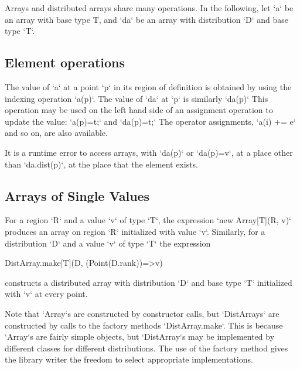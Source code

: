Arrays and distributed arrays share many operations.
In the following, let \xcd`a` be an array with base type T, and \xcd`da` be an
array with distribution \xcd`D` and base type \xcd`T`.




\subsection{Element operations}
The value of \xcd`a` at a point \xcd`p` in its region of definition is
obtained by using the indexing operation \xcd`a(p)`. 
The value of \xcd`da` at \xcd`p` is similarly
\xcd`da(p)`
This operation
may be used on the left hand side of an assignment operation to update
the value: 
\xcd`a(p)=t;`
and 
\xcd`da(p)=t;`
The operator assignments, \xcd`a(i) += e` and so on,  are also
available. 

It is a runtime error to 
access arrays, with \xcd`da(p)` or \xcd`da(p)=v`, at a place
other than \xcd`da.dist(p)`, \viz{} at the place that the element exists. 


\subsection{Arrays of Single Values}\label{ConstantArray}

For a region \xcd`R` and a value \xcd`v` of type \xcd`T`, the expression 
\xcd`new Array[T](R, v)` 
produces an array on region \xcd`R` initialized with value \xcd`v`.
Similarly, 
for a distribution \xcd`D` and a value \xcd`v` of
type \xcd`T` the expression 
\begin{xtenmath}
DistArray.make[T](D, (Point(D.rank))=>v)
\end{xtenmath}
constructs a distributed array with
distribution \xcd`D` and base type \xcd`T` initialized with \xcd`v`
at every point.

Note that \xcd`Array`s are constructed by constructor calls, but
\xcd`DistArrays` are constructed by calls to the factory methods
\xcd`DistArray.make`. This is because \xcd`Array`s are fairly simple objects,
but \xcd`DistArray`s may be implemented by different classes for different
distributions. The use of the factory method gives the library writer the
freedom to select appropriate implementations.



